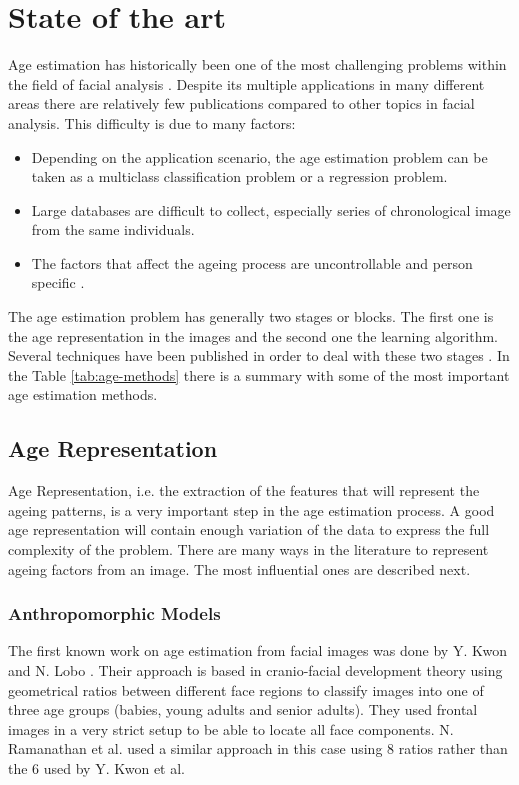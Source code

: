 \chapter{State of the art} \label{chap:sota}

Age estimation has historically been one of the most challenging problems within the field of facial analysis \cite{5406526}\cite{han:age}. Despite its multiple applications in many different areas there are relatively few publications compared to other topics in facial analysis. This difficulty is due to many factors: 
\begin{itemize}
	\item Depending on the application scenario, the age estimation problem can be taken as a multiclass classification problem or a regression problem.
	\item Large databases are difficult to collect, especially series of chronological image from the same individuals.
	\item The factors that affect the ageing process are uncontrollable and person specific \cite{4284917}\cite{4359348}\cite{1709980}.
\end{itemize}

The age estimation problem has generally two stages or blocks. The first one is the age representation in the images and the second one the learning algorithm. Several techniques have been published in order to deal with these two stages \cite{5406526}. In the Table \ref{tab:age-methods} there is a summary with some of the most important age estimation methods.

\section{Age Representation}\label{sec:ageRepre}

Age Representation, i.e. the extraction of the features that will represent the ageing patterns, is a very important step in the age estimation process. A good age representation will contain enough variation of the data to express the full complexity of the problem. There are many ways in the literature to represent ageing factors from an image. The most influential ones are described next.

\subsection{Anthropomorphic Models}\label{subsec:antropo}
The first known work on age estimation from facial images was done by Y. Kwon and N. Lobo \cite{Kwon:1999:ACF:311844.311845}. Their approach is based in cranio-facial development theory using geometrical ratios between different face regions to classify images into one of three age groups (babies, young adults and senior adults). They used frontal images in a very strict setup to be able to locate all face components. N. Ramanathan et al. \cite{1640784, Ramanathan2009131} used a similar approach in this case using 8 ratios rather than the 6 used by Y. Kwon et al.


